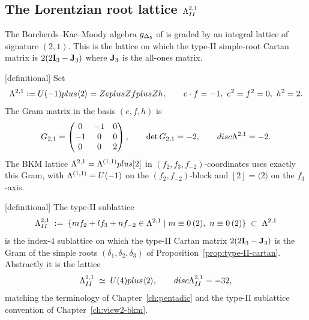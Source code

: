 \subsection{The Lorentzian root lattice $\Lambda_{II}^{2,1}$}
\label{app:lattice-II21}

The Borcherds--Kac--Moody algebra ${g_{\Delta_5}}$ of
\cite[Theorem~2.1, Section~5.1.1, case $(t=1,II,\overline 0)$]{GNII}
is graded by an integral lattice of signature $(2,1)$.  This is the
lattice on which the type-II simple-root Cartan matrix is
$2(2\mathbf{I}_3-\mathbf{J}_3)$ where $\mathbf{J}_3$ is the all-ones matrix.

\begin{definition}[Ambient $\La^{2,1}=U(-1)\oplus\langle 2\rangle$]
\label{def:lambda-21-ambient}
\textnormal{[definitional]}
Set
\[
\Lambda^{2,1}:=U(-1)plus\langle 2\rangle
=Z eplusZ fplusZ h,
\qquad e\cdot f=-1,\ e^2=f^2=0,\ h^2=2.
\]
The Gram matrix in the basis $(e,f,h)$ is
\[
G_{2,1}=\begin{pmatrix}0&-1&0\\ -1&0&0\\ 0&0&2\end{pmatrix},
\qquad \det G_{2,1}=-2,\qquad
disc\Lambda^{2,1}=-2.
\]
The BKM lattice $\Lambda^{2,1}=\Lambda^{(1,1)}plus[2]$ in
$(f_2,f_3,f_{-2})$-coordinates uses exactly this Gram, with
$\Lambda^{(1,1)}=U(-1)$ on the $(f_2,f_{-2})$-block and $[2]=\langle 2\rangle$
on the $f_3$-axis.
\end{definition}

\begin{definition}
\label{def:lambda-II-21}
\textnormal{[definitional]}
The type-II sublattice
\[
\Lambda_{II}^{2,1}\;:=\;
\{m f_2+l f_3+n f_{-2}\in\Lambda^{2,1}\mid m\equiv 0\,(2),\ n\equiv 0\,(2)\}
\;\subset\;\Lambda^{2,1}
\]
is the index-$4$ sublattice on which the type-II Cartan matrix
$2(2\mathbf{I}_3-\mathbf{J}_3)$ is the Gram of the simple roots
$(\delta_1,\delta_2,\delta_3)$ of
Proposition~\ref{prop:type-II-cartan}.  Abstractly it is the lattice
\[
\Lambda_{II}^{2,1}\;\simeq\;U(4)plus\langle 2\rangle,\qquad
disc\Lambda_{II}^{2,1}=-32,
\]
matching the terminology of Chapter~\ref{ch:pentadic} and the
type-II sublattice convention of Chapter~\ref{ch:view2-bkm}.
\end{definition}

